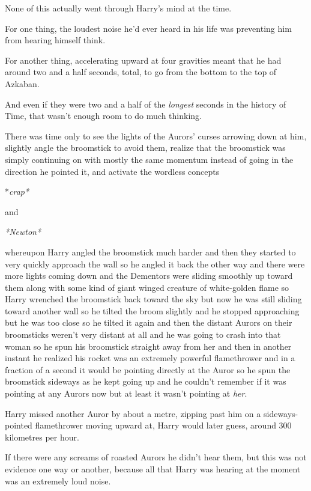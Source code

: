 None of this actually went through Harry's mind at the time.

For one thing, the loudest noise he'd ever heard in his life was preventing him
from hearing himself think.

For another thing, accelerating upward at four gravities meant that he had
around two and a half seconds, total, to go from the bottom to the top of
Azkaban.

And even if they were two and a half of the \emph{longest} seconds in the
history of Time, that wasn't enough room to do much thinking.

There was time only to see the lights of the Aurors' curses arrowing down at
him, slightly angle the broomstick to avoid them, realize that the broomstick
was simply continuing on with mostly the same momentum instead of going in the
direction he pointed it, and activate the wordless concepts

*\emph{crap*}

and

\emph{*Newton*}

whereupon Harry angled the broomstick much harder and then they started to very
quickly approach the wall so he angled it back the other way and there were
more lights coming down and the Dementors were sliding smoothly up toward them
along with some kind of giant winged creature of white-golden flame so Harry
wrenched the broomstick back toward the sky but now he was still sliding toward
another wall so he tilted the broom slightly and he stopped approaching but he
was too close so he tilted it again and then the distant Aurors on their
broomsticks weren't very distant at all and he was going to crash into that
woman so he spun his broomstick straight away from her and then in another
instant he realized his rocket was an extremely powerful flamethrower and in a
fraction of a second it would be pointing directly at the Auror so he spun the
broomstick sideways as he kept going up and he couldn't remember if it was
pointing at any Aurors now but at least it wasn't pointing at \emph{her}.

Harry missed another Auror by about a metre, zipping past him on a
sideways-pointed flamethrower moving upward at, Harry would later guess, around
300 kilometres per hour.

If there were any screams of roasted Aurors he didn't hear them, but this was
not evidence one way or another, because all that Harry was hearing at the
moment was an extremely loud noise.

